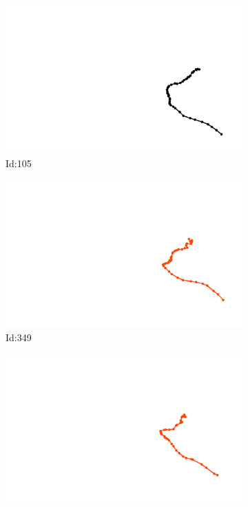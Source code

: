 \documentclass[12pt,twoside]{report}
\begin{document}
\begin{figure}
\centering
\begin{subfigure}[b]{0.20\textwidth}
\centering
\includegraphics[width=\textwidth]{../../trajectories/105.png}
\caption{Id:105}
\end{subfigure}
\begin{subfigure}[b]{0.20\textwidth}
\centering
\includegraphics[width=\textwidth]{../../trajectories/349.png}
\caption{Id:349}
\end{subfigure}
\begin{subfigure}[b]{0.20\textwidth}
\centering
\includegraphics[width=\textwidth]{../../trajectories/384.png}

\end{subfigure}
\end{figure}
\end{document}
